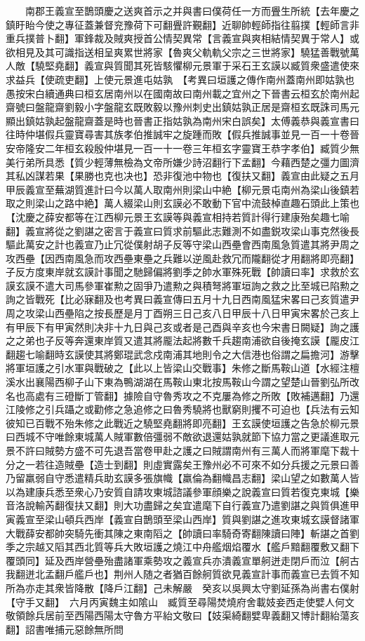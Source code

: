 　　南郡王義宣至鵲頭慶之送爽首示之并與書曰僕荷任一方而舋生所統【去年慶之鎮盱眙今使之專征蓋兼督兖豫荷下可翻舋許覲翻】近聊帥輕師指往翦撲【輕師言非重兵撲普卜翻】軍鋒裁及賊爽授首公情契異常【言義宣與爽相結情契異于常人】或欲相見及其可識指送相呈爽累世將家【魯爽父軌軌父宗之三世將家】驍猛善戰號萬人敵【驍堅堯翻】義宣與質聞其死皆駭懼柳元景軍于采石王玄謨以臧質衆盛遣使來求益兵【使疏吏翻】上使元景進屯姑孰　【考異曰垣護之傳作南州蓋南州即姑孰也愚按宋白續通典曰桓玄居南州以在國南故曰南州載之宜州之下晉書云桓玄於南州起齋號曰盤龍齋劉毅小字盤龍玄既敗毅以豫州刺史出鎮姑孰正居是齋桓玄既誅司馬元顯出鎮姑孰起盤龍齋蓋是時也晉書正指姑孰為南州宋白誤矣】太傅義恭與義宣書曰往時仲堪假兵靈寶尋害其族孝伯推誠牢之旋踵而敗【假兵推誠事並見一百一十卷晉安帝隆安二年桓玄殺殷仲堪見一百一十一卷三年桓玄字靈寶王恭字孝伯】臧質少無美行弟所具悉【質少輕薄無檢為文帝所嫌少詩沼翻行下孟翻】今藉西楚之彊力圖濟其私凶謀若果【果勝也克也决也】恐非復池中物也【復扶又翻】義宣由此疑之五月甲辰義宣至蕪湖質進計曰今以萬人取南州則梁山中絶【柳元景屯南州為梁山後鎮若取之則梁山之路中絶】萬人綴梁山則玄謨必不敢動下官中流鼓棹直趣石頭此上策也【沈慶之薛安都等在江西柳元景王玄謨等與義宣相持若質計得行建康殆矣趣七喻翻】義宣將從之劉諶之密言于義宣曰質求前驅此志難測不如盡鋭攻梁山事克然後長驅此萬安之計也義宣乃止冗從僕射胡子反等守梁山西壘會西南風急質遣其將尹周之攻西壘【因西南風急而攻西壘東壘之兵難以逆風赴救冗而隴翻從才用翻將即亮翻】子反方度東岸就玄謨計事聞之馳歸偏將劉季之帥水軍殊死戰【帥讀曰率】求救於玄謨玄謨不遣大司馬參軍崔勲之固爭乃遣勲之與積弩將軍垣詢之救之比至城已陷勲之詢之皆戰死【比必寐翻及也考異曰義宣傳曰五月十九日西南風猛宋畧曰己亥質遣尹周之攻梁山西壘陷之按長歷是月丁酉朔三日己亥八日甲辰十八日甲寅宋畧於己亥上有甲辰下有甲寅然則决非十九日與己亥或者是己酉與辛亥也今宋書日闕疑】詢之護之之弟也子反等奔還東岸質又遣其將龎法起將數千兵趨南浦欲自後掩玄謨【龎皮江翻趨七喻翻時玄謨使其將鄭琨武念戍南浦其地則令之大信港也俗謂之扁擔河】游擊將軍垣護之引水軍與戰破之【此以上皆梁山交戰事】朱修之斷馬鞍山道【水經注檀溪水出襄陽西柳子山下東為鴨湖湖在馬鞍山東北按馬鞍山今謂之望楚山晉劉弘所改名也高處有三磴斷丁管翻】據險自守魯秀攻之不克屢為修之所敗【敗補邁翻】乃還江陵修之引兵躡之或勸修之急追修之曰魯秀驍將也獸窮則攫不可迫也【兵法有云知彼知已百戰不殆朱修之此戰近之驍堅堯翻將即亮翻】王玄謨使垣護之告急於柳元景曰西城不守唯餘東城萬人賊軍數倍彊弱不敵欲退還姑孰就節下協力當之更議進取元景不許曰賊勢方盛不可先退吾當卷甲赴之護之曰賊謂南州有三萬人而將軍麾下裁十分之一若往造賊壘【造士到翻】則虛實露矣王豫州必不可來不如分兵援之元景曰善乃留羸弱自守悉遣精兵助玄謨多張旗幟【羸倫為翻幟昌志翻】梁山望之如數萬人皆以為建康兵悉至衆心乃安質自請攻東城諮議參軍顔樂之說義宣曰質若復克東城【樂音洛說輸芮翻復扶又翻】則大功盡歸之矣宜遣麾下自行義宣乃遣劉諶之與質俱進甲寅義宣至梁山頓兵西岸【義宣自鵲頭至梁山西岸】質與劉諶之進攻東城玄謨督諸軍大戰薛安都帥突騎先衝其陳之東南䧟之【帥讀曰率騎奇寄翻陳讀曰陣】斬諶之首劉季之宗越又䧟其西北質等兵大敗垣護之燒江中舟艦烟焰覆水【艦戶黯翻覆敷又翻下覆頭同】延及西岸營壘殆盡諸軍乘勢攻之義宣兵亦潰義宣單舸迸走閉戶而泣【舸古我翻迸北孟翻戶艦戶也】荆州人随之者猶百餘舸質欲見義宣計事而義宣已去質不知所為亦走其衆皆降散【降戶江翻】己未解嚴　癸亥以吳興太守劉延孫為尚書右僕射【守手又翻】　六月丙寅魏主如隂山　臧質至尋陽焚燒府舍載妓妾西走使嬖人何文敬領餘兵居前至西陽西陽太守魯方平紿文敬曰【妓渠綺翻嬖卑義翻又博計翻紿蕩亥翻】詔書唯捕元惡餘無所問